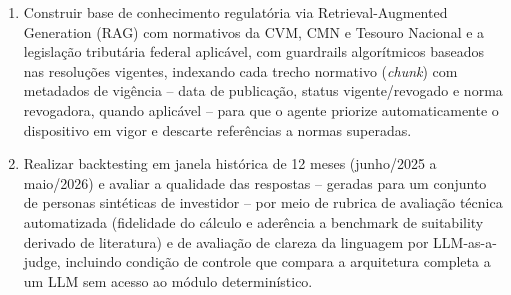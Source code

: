 \begin{enumerate}[label=(\alph*)]
  \item Construir base de conhecimento regulat\'oria via
  Retrieval-Augmented Generation (RAG) com normativos da CVM, CMN e Tesouro
  Nacional e a legisla\c{c}\~ao tribut\'aria federal aplic\'avel, com guardrails algor\'itmicos baseados nas
  resolu\c{c}\~oes vigentes, indexando cada trecho normativo (\textit{chunk})
  com metadados de vig\^encia -- data de publica\c{c}\~ao, status
  vigente/revogado e norma revogadora, quando aplic\'avel -- para que o
  agente priorize automaticamente o dispositivo em vigor e descarte
  refer\^encias a normas superadas.

  \item Realizar backtesting em janela hist\'orica de 12 meses
  (junho/2025 a maio/2026) e avaliar a qualidade das respostas -- geradas
  para um conjunto de personas sint\'eticas de investidor -- por meio de
  rubrica de avalia\c{c}\~ao t\'ecnica automatizada (fidelidade do
  c\'alculo e ader\^encia a benchmark de suitability derivado de
  literatura) e de avalia\c{c}\~ao de clareza da linguagem por
  LLM-as-a-judge, incluindo condi\c{c}\~ao de controle que compara a
  arquitetura completa a um LLM sem acesso ao m\'odulo determin\'istico.
\end{enumerate}
